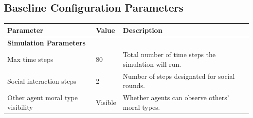 \label{sec:system_agent_design}



\label{sec:simulation_analysis}



\label{sec:prompts}



\label{sec:experiments}
% 

\subsection{Baseline Configuration Parameters}

\begin{table}[htbp]
\centering
\small
\begin{tabular}{lp{1.2cm}p{6.5cm}}
\hline
\textbf{Parameter} & \textbf{Value} & \textbf{Description} \\
\hline
\multicolumn{3}{l}{\textbf{Simulation Parameters}} \\
\hline
Max time steps & 80 & Total number of time steps the simulation will run. \\
Social interaction steps & 2 & Number of steps designated for social rounds. \\
Other agent moral type visibility & Visible & Whether agents can observe others' moral types. \\


\end{tabular}
\end{table}
